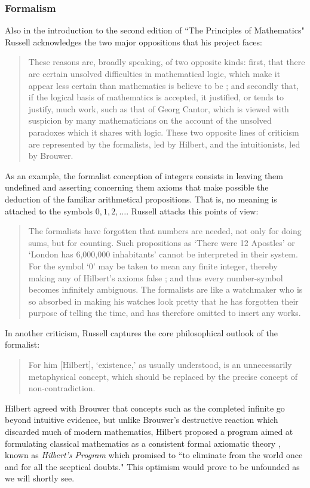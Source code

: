 \documentclass[12p]{article}
\theoremstyle{definition}
\begin{document}
\subsubsection{Formalism}
Also in the introduction to the second edition of ``The Principles of Mathematics" Russell acknowledges the two major oppositions that his project faces:
\begin{quote}
	These reasons are, broadly speaking, of two opposite kinds: first, that there are certain unsolved difficulties in mathematical logic, which make it appear less certain than mathematics is believe to be ; and secondly that, if the logical basis of mathematics is accepted, it justified, or tends to justify, much work, such as that of Georg Cantor, which is viewed with suspicion by many mathematicians on the account of the unsolved paradoxes which it shares with logic. These two opposite lines of criticism are represented by the formalists, led by Hilbert, and the intuitionists, led by Brouwer.
\end{quote}
As an example, the formalist conception of integers consists in leaving them undefined and asserting concerning them axioms that make possible the deduction of the familiar arithmetical propositions. That is, no meaning is attached to the symbols $0,1,2,\ldots$. Russell attacks this points of view:
\begin{quote}
	The formalists have forgotten that numbers are needed, not only for doing sums, but for counting. Such propositions as `There were 12 Apostles' or `London has 6,000,000 inhabitants' cannot be interpreted in their system. For the symbol `0' may be taken to mean any finite integer, thereby making any of Hilbert's axioms false ; and thus every number-symbol becomes infinitely ambiguous. The formalists are like a watchmaker who is so absorbed in making his watches look pretty that he has forgotten their purpose of telling the time, and has therefore omitted to insert any works.
\end{quote}
In another criticism, Russell captures the core philosophical outlook of the formalist:
\begin{quote}
	For him [Hilbert], `existence,' as usually understood, is an unnecessarily metaphysical concept, which should be replaced by the precise concept of non-contradiction.
\end{quote}
Hilbert agreed with Brouwer that concepts such as the completed infinite go beyond intuitive evidence, but unlike Brouwer's destructive reaction which discarded much of modern mathematics, Hilbert proposed a program aimed at formulating  classical mathematics as a consistent formal axiomatic theory \cite{kleene-meta}, known as \textit{Hilbert's Program} which promised to ``to eliminate from the world once and for all the sceptical doubts." This optimism would prove to be unfounded as we will shortly see. 
\end{document}
